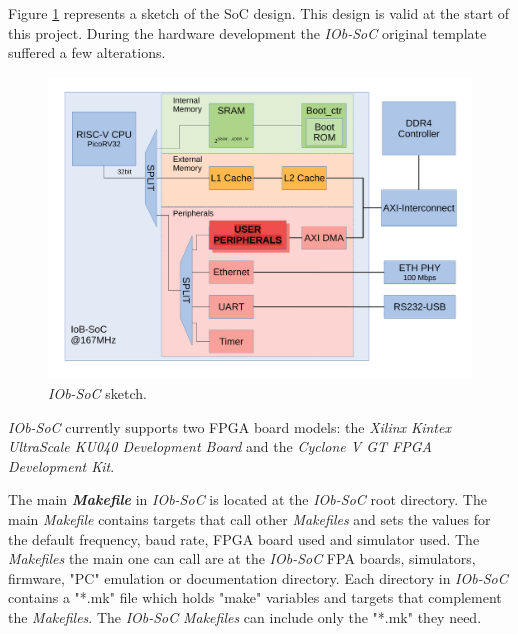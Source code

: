 Figure \ref{fig:bd_original} represents a sketch of the SoC design. This design is valid at the start of this project. During the hardware development the \textit{IOb-SoC} original template suffered a few alterations.

\begin{figure}[!ht]
  \centering
  \includegraphics[width=\linewidth]{../images/bd_original.pdf}
  \caption{\textit{IOb-SoC} sketch.}
  \label{fig:bd_original}
\end{figure}

\textit{IOb-SoC} currently supports two FPGA board models: the \textit{Xilinx Kintex UltraScale KU040 Development Board} and the \textit{Cyclone V GT FPGA Development Kit}.

The main \textbf{\textit{Makefile}} in \textit{IOb-SoC} is located at the \textit{IOb-SoC} root directory. The main \textit{Makefile} contains targets that call other \textit{Makefiles} and sets the values for the default frequency, baud rate, FPGA board used and simulator used. The \textit{Makefiles} the main one can call are at the \textit{IOb-SoC} FPA boards, simulators, firmware, "PC" emulation or documentation directory. Each directory in \textit{IOb-SoC} contains a "*.mk" file which holds "make" variables and targets that complement the \textit{Makefiles}. The \textit{IOb-SoC} \textit{Makefiles} can include only the "*.mk" they need.


